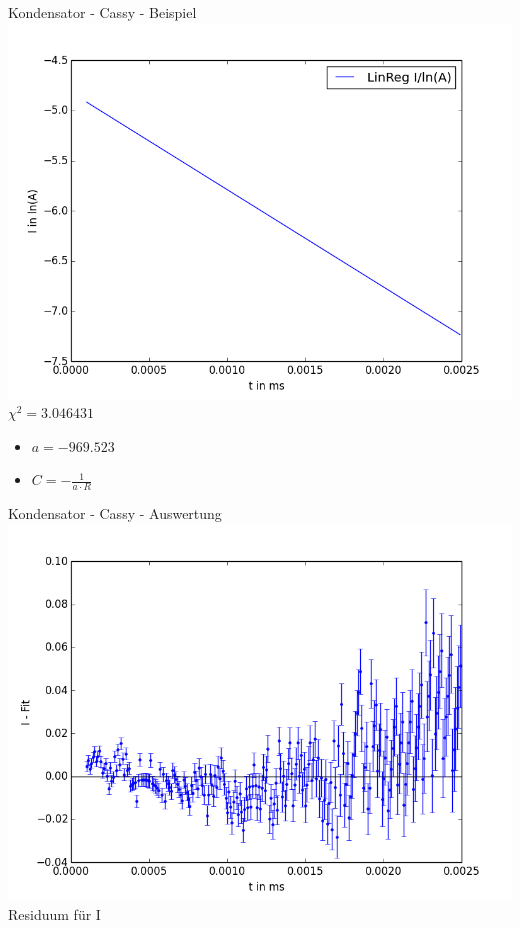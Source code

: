 \documentclass[11pt]{beamer}
\begin{document}
\begin{frame}{Kondensator - Cassy - Beispiel}
\includegraphics[scale=0.2]{lin_reg_I}\\
$\chi^2 = 3.046431$
\begin{itemize}
\item $a = -969.523$
\item $C = -\frac{1}{a\cdot R}$
\end{itemize}
\end{frame}

\begin{frame}{Kondensator - Cassy - Auswertung}
\includegraphics[scale=0.2]{residuum_I}\\
Residuum für I 
\end{frame}
\end{document}
